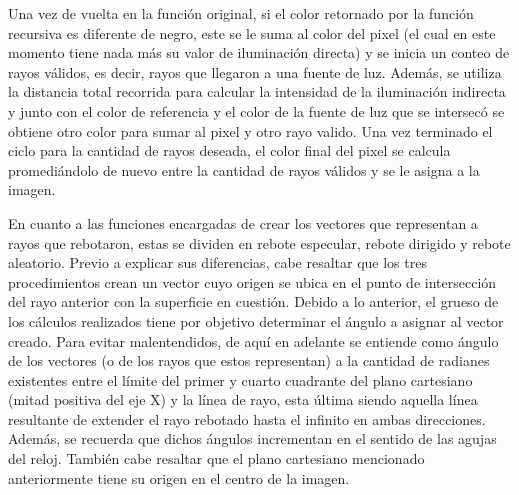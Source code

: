 \documentclass[conference]{IEEEtran}
\begin{document}
Una vez de vuelta en la función original, si el color retornado por la función recursiva es diferente de negro, este se le suma al color del pixel (el cual en este momento tiene nada más su valor de iluminación directa) y se inicia un conteo de rayos válidos, es decir, rayos que llegaron a una fuente de luz. Además, se utiliza la distancia total recorrida para calcular la intensidad de la iluminación indirecta y junto con el color de referencia y el color de la fuente de luz que se intersecó se obtiene otro color para sumar al pixel y otro rayo valido. Una vez terminado el ciclo para la cantidad de rayos deseada, el color final del pixel se calcula promediándolo de nuevo entre la cantidad de rayos válidos y se le asigna a la imagen.  

En cuanto a las funciones encargadas de crear los vectores que representan a rayos que rebotaron, estas se dividen en rebote especular, rebote dirigido y rebote aleatorio. Previo a explicar sus diferencias, cabe resaltar que los tres procedimientos crean un vector cuyo origen se ubica en el punto de intersección del rayo anterior con la superficie en cuestión. Debido a lo anterior, el grueso de los cálculos realizados tiene por objetivo determinar el ángulo a asignar al vector creado. Para evitar malentendidos, de aquí en adelante se entiende como ángulo de los vectores (o de los rayos que estos representan) a la cantidad de radianes existentes entre el límite del primer y cuarto cuadrante del plano cartesiano (mitad positiva del eje X) y la línea de rayo, esta última siendo aquella línea resultante de extender el rayo rebotado hasta el infinito en ambas direcciones. Además, se recuerda que dichos ángulos incrementan en el sentido de las agujas del reloj. También cabe resaltar que el plano cartesiano mencionado anteriormente tiene su origen en el centro de la imagen.
\end{document}
